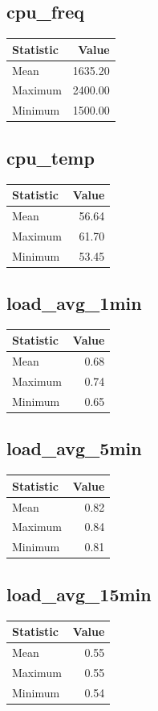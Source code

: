 \documentclass[11pt]{article}
\begin{document}
\subsection{cpu_freq}
\begin{tabular}{lr}
\toprule
Statistic & Value \\
\midrule
Mean & 1635.20 \\
Maximum & 2400.00 \\
Minimum & 1500.00 \\
\bottomrule
\end{tabular}


\subsection{cpu_temp}
\begin{tabular}{lr}
\toprule
Statistic & Value \\
\midrule
Mean & 56.64 \\
Maximum & 61.70 \\
Minimum & 53.45 \\
\bottomrule
\end{tabular}


\subsection{load_avg_1min}
\begin{tabular}{lr}
\toprule
Statistic & Value \\
\midrule
Mean & 0.68 \\
Maximum & 0.74 \\
Minimum & 0.65 \\
\bottomrule
\end{tabular}


\subsection{load_avg_5min}
\begin{tabular}{lr}
\toprule
Statistic & Value \\
\midrule
Mean & 0.82 \\
Maximum & 0.84 \\
Minimum & 0.81 \\
\bottomrule
\end{tabular}


\subsection{load_avg_15min}
\begin{tabular}{lr}
\toprule
Statistic & Value \\
\midrule
Mean & 0.55 \\
Maximum & 0.55 \\
Minimum & 0.54 \\
\bottomrule
\end{tabular}
\end{document}
